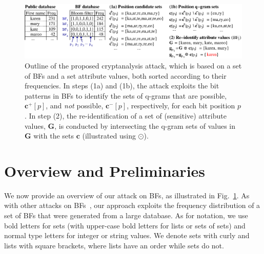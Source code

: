 \documentclass{llncs}
\begin{document}
\begin{figure}[t]
  \centering
  \includegraphics[width=1.0\textwidth]{bf-attack-outline}
  \caption{Outline of the proposed cryptanalysis attack, which is
           based on a set of BFs and a set attribute values, both
           sorted according to their frequencies. In steps (1a) and
           (1b), the attack exploits the bit patterns in BFs to
           identify the sets of q-grams that are possible,
           $\mathbf{c}^+[p]$, and \emph{not} possible,
           $\mathbf{c}^-[p]$, respectively, for each bit position
           $p$. In step (2), the re-identification of a set of
           (sensitive) attribute values, $\mathbf{G}$, is conducted
           by intersecting the q-gram sets of values in $\mathbf{G}$
           with the sets $\mathbf{c}$ (illustrated using $\odot$).
           \label{fig:outline}}
\end{figure}

\section{Overview and Preliminaries}
\label{sec-overview}

We now provide an overview of our attack on BFs, as illustrated in
Fig.~\ref{fig:outline}. As with other attacks on
BFs~\cite{Kro15,Kuz11,Kuz13,Nie14}, our approach exploits the
frequency distribution of a set of BFs that were generated from a
large database. As for notation, we use bold letters for sets
(with upper-case bold letters for lists or sets of sets) and normal
type letters for integer or string values. We denote sets with curly
and lists with square brackets, where lists have an order while sets
do not.
\end{document}
